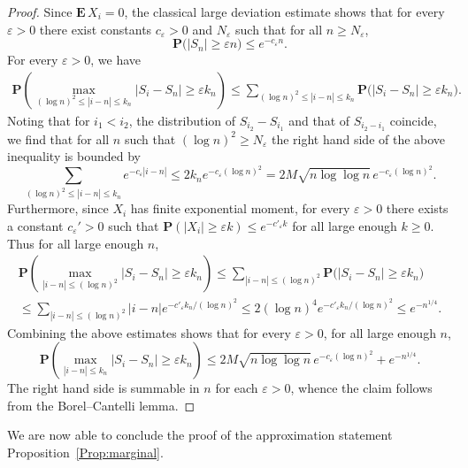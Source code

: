 \documentclass[10pt]{amsart}
\theoremstyle{definition}\newtheorem{defi}[theo]{Definition}\newtheorem{rema}[theo]{Remark}\newtheorem{exam}[theo]{Example}\newtheorem{exem}[theo]{Example}\newtheorem{nota}[theo]{Notation}
\newcommand{\e}{\varepsilon}
\newcommand{\Pb}{\mathbf{P}}
\newcommand{\Eb}{\mathbf{E}\,}
\renewcommand{\(}{\left(}
\renewcommand{\)}{\right)}
\begin{document}
\begin{proof}
Since $\Eb X_i=0$, the classical large deviation estimate shows that for every $\e>0$ there exist constants $c_\e>0$ and $N_\e$ such that for all $n \ge N_\e$,
\[
\Pb\big(|S_n| \ge \e n\big) \le e^{-c_\e n}.
\]
For every $\e>0$, we have
\begin{align*}
\Pb\left(\max_{(\log n)^2 \le |i-n| \le k_n} |S_i-S_n| \ge \e k_n\right)
\le \sum_{(\log n)^2 \le |i-n|\le k_n}\Pb\bigl(|S_i-S_n| \ge \e k_n\bigr).
\end{align*}
Noting that for $i_1<i_2$, the distribution of $S_{i_2}-S_{i_1}$ and that of $S_{i_2-i_1}$ coincide, we find that for all $n$ such that $(\log n)^2\ge N_\e$ the right hand side of the above inequality is bounded by
\[
\sum_{(\log n)^2 \le |i-n|\le k_n}e^{-c_\e |i-n|} \le 2 k_n e^{-c_\e (\log n)^2}=2M\sqrt{n \log \log n}\,e^{-c_\e (\log n)^2}.
\]
Furthermore, since $X_i$ has finite exponential moment, for every $\e>0$ there exists a constant $c_\e'>0$ such that $\Pb(|X_i|\ge \e k)\le e^{-c'_\e k}$ for all large enough $k \ge 0$. Thus for all large enough $n$,
\begin{multline*}
\Pb\left(\max_{|i-n|\le (\log n)^2}|S_i-S_n| \ge \e k_n\right)
\le \sum_{|i-n| \le (\log n)^2}\Pb\bigl(|S_i-S_n| \ge \e k_n\bigr)\\
\le \sum_{|i-n|\le (\log n)^2}|i-n|e^{-c'_\e k_n/(\log n)^2}\le 2(\log n)^4 e^{-c'_\e k_n/(\log n)^2}\le e^{-n^{1/4}}.
\end{multline*}
Combining the above estimates shows that for every $\e>0$, for all large enough $n$,
\[
\Pb\left(\max_{|i-n|\le k_n}|S_i-S_n| \ge \e k_n\right)\le 2M\sqrt{n \log \log n}\,e^{-c_\e (\log n)^2}+e^{-n^{1/4}}.
\]
The right hand side is summable in $n$ for each $\e>0$, whence the claim follows from the Borel--Cantelli lemma.
\end{proof}

We are now able to conclude the proof of the approximation statement Proposition~\ref{Prop:marginal}.
\end{document}
